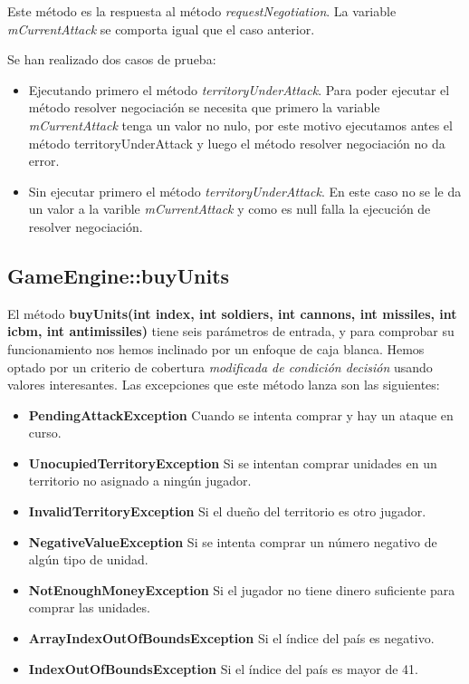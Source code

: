 Este método es la respuesta al método \textit{requestNegotiation}. La variable \textit{mCurrentAttack} se comporta igual que el caso anterior.

Se han realizado dos casos de prueba:
\begin{itemize}
\item Ejecutando primero el método \textit{territoryUnderAttack}. Para poder ejecutar el método resolver negociación se necesita que primero la variable \textit{mCurrentAttack} tenga un valor no nulo, por este motivo ejecutamos antes el método territoryUnderAttack y luego el método resolver negociación no da error.
\item Sin ejecutar primero el método \textit{territoryUnderAttack}. En este caso no se le da un valor a la varible \textit{mCurrentAttack} y como es null falla la ejecución de resolver negociación.
\end{itemize}


\subsection{GameEngine::buyUnits}

El método \textbf{buyUnits(int index, int soldiers, int cannons, int missiles, int icbm, int antimissiles)} tiene seis parámetros de entrada, y para comprobar su funcionamiento nos hemos inclinado por un enfoque de caja blanca. Hemos optado por un criterio de 
cobertura \textit{modificada de condición decisión } usando valores interesantes.
Las excepciones que este método lanza son las siguientes:
\begin{itemize}
\item \textbf{PendingAttackException} Cuando se intenta comprar y hay un ataque en curso.
\item \textbf{UnocupiedTerritoryException} Si se intentan comprar unidades en un territorio no asignado a ningún jugador.
\item \textbf{InvalidTerritoryException} Si el dueño del territorio es otro jugador.
\item \textbf{NegativeValueException} Si se intenta comprar un número negativo de algún tipo de unidad.
\item \textbf{NotEnoughMoneyException} Si el jugador no tiene dinero suficiente para comprar las unidades.
\item \textbf{ArrayIndexOutOfBoundsException} Si el índice del país es negativo.
\item \textbf{IndexOutOfBoundsException} Si el índice del país es mayor de 41.
\end{itemize}

